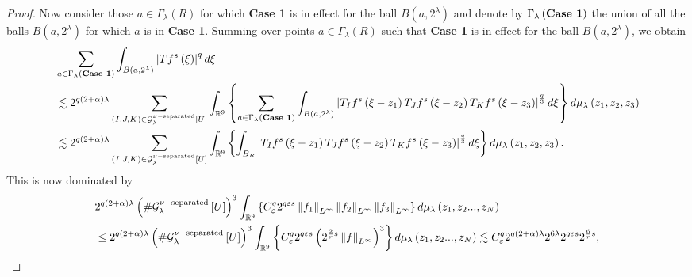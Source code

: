 \documentclass{amsart}%
\theoremstyle{plain}
\numberwithin{equation}{section}
\begin{document}
\begin{proof}
Now consider those $a\in\Gamma_{\lambda}\left(  R\right)  $ for which
\textbf{Case 1} is in effect for the ball $B\left(  a,2^{\lambda}\right)  $
and denote by $\Gamma_{\lambda}\left(  \text{\textbf{Case 1}}\right)  $ the
union of all the balls $B\left(  a,2^{\lambda}\right)  $ for which $a$ is in
\textbf{Case 1}. Summing over points $a\in\Gamma_{\lambda}\left(  R\right)  $
such that \textbf{Case 1} is in effect for the ball $B\left(  a,2^{\lambda
}\right)  $, we obtain%
\begin{align*}
&  \sum_{a\in\Gamma_{\lambda}\left(  \text{\textbf{Case 1}}\right)  }%
\int_{B\left(  a,2^{\lambda}\right)  }\left\vert Tf^{s}\left(  \xi\right)
\right\vert ^{q}d\xi\\
&  \lesssim2^{q\left(  2+\alpha\right)  \lambda}\sum_{\left(  I,J,K\right)
\in\mathcal{G}_{\lambda}^{\nu-\mathop{\rm separated}}\left[  U\right]  }%
\int_{\mathbb{R}^{9}}\left\{  \sum_{a\in\Gamma_{\lambda}\left(
\text{\textbf{Case 1}}\right)  }\int_{B\left(  a,2^{\lambda}\right)
}\left\vert T_{I}f^{s}\left(  \xi-z_{1}\right)  T_{J}f^{s}\left(  \xi
-z_{2}\right)  T_{K}f^{s}\left(  \xi-z_{3}\right)  \right\vert ^{\frac{q}{3}%
}d\xi\right\}  d\mu_{\lambda}\left(  z_{1},z_{2},z_{3}\right) \\
&  \lesssim2^{q\left(  2+\alpha\right)  \lambda}\sum_{\left(  I,J,K\right)
\in\mathcal{G}_{\lambda}^{\nu-\mathop{\rm separated}}\left[  U\right]  }%
\int_{\mathbb{R}^{9}}\left\{  \int_{B_{R}}\left\vert T_{I}f^{s}\left(
\xi-z_{1}\right)  T_{J}f^{s}\left(  \xi-z_{2}\right)  T_{K}f^{s}\left(
\xi-z_{3}\right)  \right\vert ^{\frac{q}{3}}d\xi\right\}  d\mu_{\lambda
}\left(  z_{1},z_{2},z_{3}\right)  .
\end{align*}
This is now dominated by%
\begin{align*}
&  2^{q\left(  2+\alpha\right)  \lambda}\left(  \#\mathcal{G}_{\lambda}%
^{\nu-\mathop{\rm separated}}\left[  U\right]  \right)  ^{3}\int
_{\mathbb{R}^{9}}\left\{  C_{\varepsilon}^{q}2^{q\varepsilon s}\left\Vert
f_{1}\right\Vert _{L^{\infty}}\left\Vert f_{2}\right\Vert _{L^{\infty}%
}\left\Vert f_{3}\right\Vert _{L^{\infty}}\right\}  d\mu_{\lambda}\left(
z_{1},z_{2}...,z_{N}\right) \\
&  \leq2^{q\left(  2+\alpha\right)  \lambda}\left(  \#\mathcal{G}_{\lambda
}^{\nu-\mathop{\rm separated}}\left[  U\right]  \right)  ^{3}\int
_{\mathbb{R}^{9}}\left\{  C_{\varepsilon}^{q}2^{q\varepsilon s}\left(
2^{\frac{2}{r}s}\left\Vert f\right\Vert _{L^{\infty}}\right)  ^{3}\right\}
d\mu_{\lambda}\left(  z_{1},z_{2}...,z_{N}\right)  \lesssim C_{\varepsilon
}^{q}2^{q\left(  2+\alpha\right)  \lambda}2^{6\lambda}2^{q\varepsilon
s}2^{\frac{6}{r}s},
\end{align*}



\end{proof}
\end{document}
